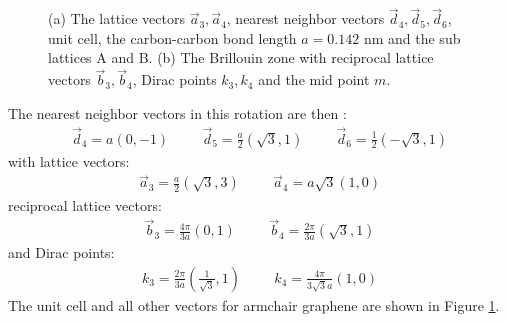 \begin{figure}[h]
\begin{subfigure}[h]{0.47\textwidth}
					\caption{}
				\end{subfigure}
				\caption{(a) The lattice vectors $\vec{a}_{3},\vec{a}_{4}$, nearest neighbor vectors $\vec{d}_{4},\vec{d}_{5},\vec{d}_{6}$, unit cell, the carbon-carbon bond length $a=0.142$ nm and the sub lattices A and B. (b) The Brillouin zone with reciprocal lattice vectors $\vec{b}_{3},\vec{b}_{4}$, Dirac points $k_{3},k_{4}$ and the mid point $m$.}
				\label{introduction-structure-armchair}
			\end{figure}
			The nearest neighbor vectors in this rotation are then \cite{b55}:
			\begin{align}
				\vec{d}_{4}=a\left(0,-1\right)
				\hspace{1cm}
				\vec{d}_{5}=\frac{a}{2}\left(\sqrt{3},1\right)
				\hspace{1cm}
				\vec{d}_{6}=\frac{1}{2}\left(-\sqrt{3},1\right)
			\end{align}
			with lattice vectors:
			\begin{align}
				\vec{a}_{3}=\frac{a}{2}\left(\sqrt{3},3\right)\hspace{1cm}\vec{a}_{4}=a\sqrt{3}\left(1,0\right)
			\end{align}
			reciprocal lattice vectors:
			\begin{align}
				\vec{b}_{3}=\frac{4\pi}{3a}\left(0,1\right)\hspace{1cm}\vec{b}_{4}=\frac{2\pi}{3a}\left(\sqrt{3},1\right)
			\end{align}
			and Dirac points:
			\begin{align}
				k_{3}=\frac{2\pi}{3a}\left(\frac{1}{\sqrt{3}},1\right)\hspace{1cm}k_{4}=\frac{4\pi}{3\sqrt{3}a}\left(1,0\right)
			\end{align}
			The unit cell and all other vectors for armchair graphene are shown in Figure \ref{introduction-structure-armchair}.
